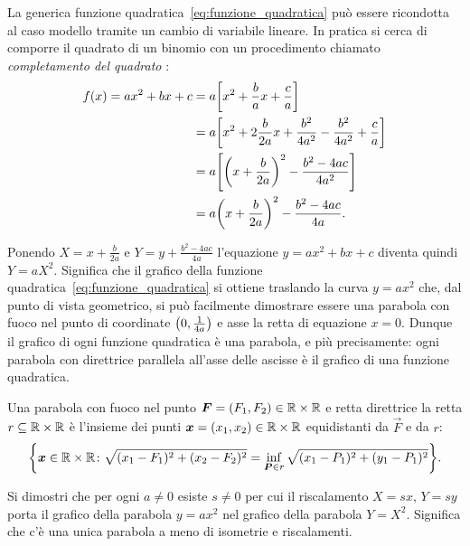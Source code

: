 La generica funzione quadratica~\eqref{eq:funzione_quadratica}
può essere ricondotta al caso modello tramite un cambio
di variabile lineare. In pratica si cerca di comporre il quadrato
di un binomio con un procedimento chiamato
\emph{completamento del quadrato}%
%
:
\begin{equation}\label{eq:24589}
\begin{aligned}
f(x) = ax^2+bx+c
  &= a {\left[ x^2+\frac b a x + \frac c a \right]}\\
  &= a {\left[ x^2+2 \frac{b}{2a} x + \frac{b^2}{4a^2} - \frac{b^2}{4a^2} + \frac c a \right]}\\
  &= a {\left[ {\left( x+\frac{b}{2a} \right)}^2 - \frac{b^2-4ac}{4a^2} \right]} \\
  &= a{\left( x+\frac b{2a} \right)}^2  - \frac{b^2-4ac}{4a}.
\end{aligned}
\end{equation}

Ponendo $X=x+\frac b{2a}$ e $Y=y+\frac{b^2-4ac}{4a}$
l'equazione $y=ax^2+bx+c$ diventa quindi $Y=aX^2$. 
Significa
che il grafico della funzione quadratica~\eqref{eq:funzione_quadratica}
si ottiene traslando la curva $y = a x^2$ che, 
dal punto di vista geometrico, si può facilmente
dimostrare essere una parabola con fuoco
nel punto di coordinate ${\left( 0,\frac 1 {4a} \right)}$
e asse la retta di equazione $x=0$.
Dunque il grafico di ogni funzione quadratica è una parabola, 
e più precisamente: ogni parabola con direttrice parallela all'asse delle
ascisse è il grafico di una funzione quadratica.

\begin{definition}[parabola]
  Una parabola con fuoco nel punto $\boldsymbol F=(F_1,F_2)\in {\mathbb R}\times {\mathbb R}$ 
  e retta direttrice 
  la retta $r \subseteq {\mathbb R}\times{\mathbb R}$ 
  è l'insieme dei punti  $\boldsymbol x = (x_1,x_2)\in {\mathbb R}\times{\mathbb R}$ 
  equidistanti da $\vec F$ e da $r$:
  \[
  {\left\{ \boldsymbol x\in {\mathbb R}\times{\mathbb R}\colon 
  \sqrt{(x_1-F_1)^2 + (x_2-F_2)^2} 
  = \inf_{\boldsymbol P\in r}\sqrt{(x_1-P_1)^2+(y_1-P_1)^2}
   \right\}}.
  \]
\end{definition}

\begin{exercise}
  Si dimostri che per ogni $a\neq 0$ esiste $s\neq 0$ 
  per cui il riscalamento $X=sx$, $Y=sy$ porta il grafico della 
  parabola $y=ax^2$ nel grafico della parabola $Y=X^2$.
  Significa che 
  c'è una unica parabola 
  a meno di isometrie e riscalamenti.
\end{exercise}

